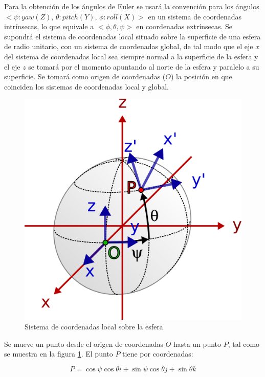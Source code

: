 \documentclass[12pt, a4paper]{report}
\begin{document}
Para la obtención de los ángulos de Euler se usará la convención para los ángulos $<\psi: yaw (Z),\, \theta: pitch (Y),\, \phi: roll (X)>$ en un sistema de coordenadas intrínsecas, lo que equivale a $<\phi, \theta, \psi>$ en coordenadas extrínsecas. Se supondrá el sistema de coordenadas local situado sobre la superficie de una esfera de radio unitario, con un sistema de coordenadas global, de tal modo que el eje $x$ del sistema de coordenadas local sea siempre normal a la superficie de la esfera y el eje $z$ se tomará por el momento apuntando al norte de la esfera y paralelo a su superficie. Se tomará como origen de coordenadas ($O$) la posición en que coinciden los sistemas de coordenadas local y global.\\

\begin{figure}[h]
	\centering
		\includegraphics[scale=0.85]{../img/sphere.png} 
	\caption{Sistema de coordenadas local sobre la esfera}
	\label{fig: esfera_coordenadas}
\end{figure}

Se mueve un punto desde el origen de coordenadas $O$ hasta un punto $P$, tal como se muestra en la figura \ref{fig: esfera_coordenadas}. El punto $P$ tiene por coordenadas:

$$ P = \cos \psi \cos \theta i + \sin \psi \cos \theta j + \sin \theta k$$
\end{document}
